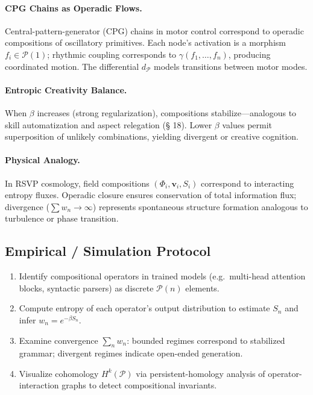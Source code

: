 \documentclass[12pt,a4paper,twoside,openright]{book}
\begin{document}
\paragraph{CPG Chains as Operadic Flows.}
Central-pattern-generator (CPG) chains in motor control correspond to operadic compositions of oscillatory primitives.  
Each node’s activation is a morphism $f_i\in\mathcal{P}(1)$; rhythmic coupling corresponds to $\gamma(f_1,\ldots,f_n)$, producing coordinated motion.  
The differential $d_{\mathcal{P}}$ models transitions between motor modes.

\paragraph{Entropic Creativity Balance.}
When $\beta$ increases (strong regularization), compositions stabilize—analogous to skill automatization and aspect relegation (§ 18).  
Lower $\beta$ values permit superposition of unlikely combinations, yielding divergent or creative cognition.

\paragraph{Physical Analogy.}
In RSVP cosmology, field compositions $(\Phi_i,\mathbf{v}_i,S_i)$ correspond to interacting entropy fluxes.  
Operadic closure ensures conservation of total information flux; divergence ($\sum w_n\!\to\!\infty$) represents spontaneous structure formation analogous to turbulence or phase transition.

\subsection*{Empirical / Simulation Protocol}

\begin{enumerate}
\item Identify compositional operators in trained models (e.g.\ multi-head attention blocks, syntactic parsers) as discrete $\mathcal{P}(n)$ elements.
\item Compute entropy of each operator’s output distribution to estimate $S_n$ and infer $w_n=e^{-\beta S_n}$.
\item Examine convergence $\sum_n w_n$: bounded regimes correspond to stabilized grammar; divergent regimes indicate open-ended generation.
\item Visualize cohomology $H^k(\mathcal{P})$ via persistent-homology analysis of operator-interaction graphs to detect compositional invariants.
\end{enumerate}
\end{document}

